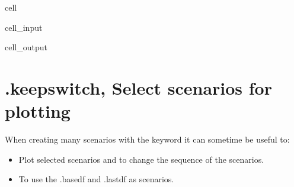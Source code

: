 \documentclass[letterpaper,10pt,english]{jupyterBook}
\begin{document}
\begin{sphinxuseclass}{cell}\begin{sphinxVerbatimInput}

\begin{sphinxuseclass}{cell_input}
\begin{sphinxVerbatim}[commandchars=\\\{\}]
   
     
     
     
\end{sphinxVerbatim}

\end{sphinxuseclass}\end{sphinxVerbatimInput}
\begin{sphinxVerbatimOutput}

\begin{sphinxuseclass}{cell_output}
\noindent{}

\end{sphinxuseclass}\end{sphinxVerbatimOutput}

\end{sphinxuseclass}

\section{.keepswitch, Select scenarios for plotting}
\label{\detokenize{content/howto/experiments/create_save_scenarios:keepswitch-select-scenarios-for-plotting}}
\sphinxAtStartPar
When creating many scenarios with the  keyword it can sometime be useful to:
\begin{itemize}
\item {} 
\sphinxAtStartPar
Plot selected scenarios and to change the sequence of the scenarios.

\item {} 
\sphinxAtStartPar
To use the .basedf and .lastdf as scenarios.

\end{itemize}
\end{document}
